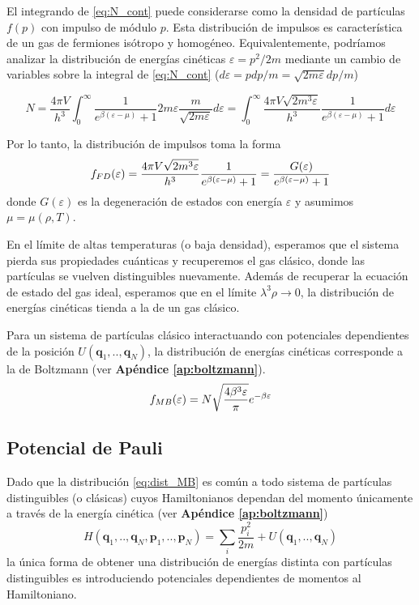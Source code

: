 El integrando de \eqref{eq:N_cont} puede considerarse como la densidad de partículas $f(p)$ con impulso de módulo $p$.
Esta distribución de impulsos es característica de un gas de fermiones isótropo y homogéneo.
Equivalentemente, podríamos analizar la distribución de energías cinéticas $\varepsilon=p^2/2m$ mediante un cambio de variables sobre la integral de \eqref{eq:N_cont}
($d\varepsilon = pdp/m = \sqrt{2m\varepsilon}dp/m$)

\[ N = \frac{4\pi V}{h^3} \int_0^\infty \frac{1}{e^{\beta(\varepsilon-\mu)}+1} 2m\varepsilon\frac{m}{\sqrt{2m\varepsilon}}d\varepsilon =
\int_0^\infty \frac{4\pi V\sqrt{2m^3\varepsilon}}{h^3}\frac{1}{e^{\beta(\varepsilon-\mu)}+1} d\varepsilon\]

Por lo tanto, la distribución de impulsos toma la forma
\begin{equation}{\label{eq:dist_FD}}
 f_{FD}(\varepsilon) = \frac{4\pi V \sqrt{2m^3\varepsilon}}{h^3}\frac{1}{e^{\beta(\varepsilon-\mu)}+1} = \frac{G(\varepsilon)}{e^{\beta(\varepsilon-\mu)}+1}
\end{equation}
donde $G(\varepsilon)$ es la degeneración de estados con energía $\varepsilon$ y asumimos $\mu=\mu(\rho,T)$.

En el límite de altas temperaturas (o baja densidad), esperamos que el sistema pierda sus propiedades cuánticas y recuperemos el gas clásico, donde las partículas
se vuelven distinguibles nuevamente.
Además de recuperar la ecuación de estado del gas ideal, esperamos que en el límite $\lambda^3\rho\to0$, la distribución de energías cinéticas tienda a la de un gas clásico.

Para un sistema de partículas clásico interactuando con potenciales dependientes de la posición $U(\mathbf{q}_1,..,\mathbf{q}_N)$, la distribución de energías cinéticas
corresponde a la de Boltzmann (ver \textbf{Apéndice \ref{ap:boltzmann}}).
\begin{equation}{\label{eq:dist_MB}}
 f_{MB}(\varepsilon) = N\sqrt{\frac{4\beta^3\varepsilon}{\pi}}e^{-\beta\varepsilon}
\end{equation}



\subsection{Potencial de Pauli}{\label{sec:intro_pauli}}

Dado que la distribución \eqref{eq:dist_MB} es común a todo sistema de partículas distinguibles (o clásicas) cuyos Hamiltonianos dependan del momento únicamente
a través de la energía cinética (ver  \textbf{Apéndice \ref{ap:boltzmann}})
\[ H(\mathbf{q}_1,..,\mathbf{q}_N,\mathbf{p}_1,..,\mathbf{p}_N) = \sum_i \frac{p_i^2}{2m} + U(\mathbf{q}_1,..,\mathbf{q}_N)\]
la única forma de obtener una distribución de energías distinta con partículas distinguibles es introduciendo potenciales dependientes de momentos al Hamiltoniano.

